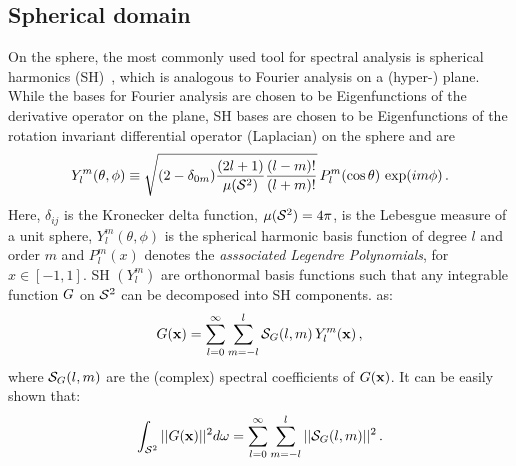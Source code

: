 %
%
%
\subsection{Spherical domain}
On the sphere, the most commonly used tool for spectral analysis is spherical harmonics
(SH)~\cite{Groemer1996}, which is analogous to Fourier analysis on a (hyper-) plane. While the bases for Fourier analysis are chosen to be Eigenfunctions of the derivative operator on the plane, SH bases are chosen to be Eigenfunctions of the rotation invariant differential operator (Laplacian) on the sphere and are
%
\begin{equation}
\label{eq:SH}
Y_l^m(\theta,\phi) \equiv {\sqrt{(2-\delta_{0m})\frac{(2l+1)}{{\mu({\mathcal{S}^{2}})}}\frac{(l-m)!}{(l+m)!}}} \, P_l^m(\cos\theta) \, \exp({im\phi})\,.
\end{equation}
%
Here, $\delta_{ij}$ is the Kronecker delta function, ${\mu({\mathcal{S}^{2}})}=4\pi$, is the Lebesgue measure of a unit 
sphere, $Y_l^m(\theta,\phi)$ is the spherical harmonic basis
function of degree $l$ and order $m$ and $P_l^m(x)$ denotes  the \emph{asssociated Legendre
Polynomials}, for $x \in [-1,1]$. SH $(Y_l^m)$ are orthonormal basis functions such that  any integrable function
${G}$ on ${\mathcal{S}^{2}}$ can be decomposed into SH components.
 as:
\begin{align}
\label{eq:SHDecomposition}
{G}(\mathbf{x}) = \sum_{l=0}^{\infty} \sum_{m=-l}^{l}  \mathcal{S}_{{G}}(l,m) \, Y_l^m(\mathbf{x})\,,
\end{align}
%
where $\mathcal{S}_{{G}}(l,m)$ are the (complex) spectral coefficients of ${G}(\mathbf{x})$. 
It can be easily shown that:
%
\begin{equation}
\int_{{\mathcal{S}^{2}}} ||{G}(\mathbf{x})||^2 d\omega = \sum_{l=0}^{\infty} \sum_{m=-l}^{l} ||\mathcal{S}_{{G}}(l,m)||^2\,.
\end{equation}

